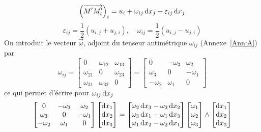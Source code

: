 \begin{equation*}
    \left( \overrightarrow{M'M_t'} \right)_i = u_i + \omega_{ij} \mathop{\mathrm{{}d}}\mathopen{} x_j + \varepsilon_{ij} \mathop{\mathrm{{}d}}\mathopen{} x_j
\end{equation*}
\begin{equation}
    \varepsilon_{ij} = \frac{1}{2} \left( u_{i,j} + u_{j,i} \right), \quad \omega_{ij} = \frac{1}{2} \left( u_{i,j} - u_{j,i} \right)
    \label{eq:Ch03-034}
\end{equation}
On introduit le vecteur $\vec{\omega}$, adjoint du tenseur antimétrique $\omega_{ij}$ (Annexe~\ref{Ann:A}) par
\begin{equation}
    \omega_{ij} =
    \begin{bmatrix}
        0 & \omega_{12} & \omega_{13} \\
        \omega_{21} & 0 & \omega_{23} \\
        \omega_{31} & \omega_{32} & 0
    \end{bmatrix}
    =
    \begin{bmatrix}
        0 & -\omega_{3} & \omega_{2} \\
        \omega_{3} & 0 & -\omega_{1} \\
        -\omega_{2} & \omega_{1} & 0
    \end{bmatrix}
    \label{eq:Ch03-035}
\end{equation}
ce qui permet d'écrire pour $\omega_{ij} \mathop{\mathrm{{}d}}\mathopen{} x_j$
\begin{equation}
    \begin{bmatrix}
        0 & -\omega_{3} & \omega_{2} \\
        \omega_{3} & 0 & -\omega_{1} \\
        -\omega_{2} & \omega_{1} & 0
    \end{bmatrix}
    \begin{bmatrix}
        \mathop{\mathrm{{}d}}\mathopen{} x_1 \\
        \mathop{\mathrm{{}d}}\mathopen{} x_2 \\
        \mathop{\mathrm{{}d}}\mathopen{} x_3
    \end{bmatrix}
    =
    \begin{bmatrix}
        \omega_2 \mathop{\mathrm{{}d}}\mathopen{} x_3 - \omega_3 \mathop{\mathrm{{}d}}\mathopen{} x_2 \\
        \omega_3 \mathop{\mathrm{{}d}}\mathopen{} x_1 - \omega_1 \mathop{\mathrm{{}d}}\mathopen{} x_3 \\
        \omega_1 \mathop{\mathrm{{}d}}\mathopen{} x_2 - \omega_2 \mathop{\mathrm{{}d}}\mathopen{} x_1
    \end{bmatrix}
    \begin{bmatrix}
        \omega_1 \\
        \omega_2 \\
        \omega _3
    \end{bmatrix}
    \wedge 
    \begin{bmatrix}
        \mathop{\mathrm{{}d}}\mathopen{} x_1 \\
        \mathop{\mathrm{{}d}}\mathopen{} x_2 \\
        \mathop{\mathrm{{}d}}\mathopen{} x_3
    \end{bmatrix}
    \label{eq:Ch03-036}
\end{equation}
